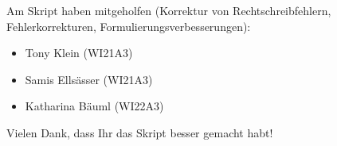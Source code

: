 Am Skript haben mitgeholfen
(Korrektur von Rechtschreibfehlern, Fehlerkorrekturen, Formulierungsverbesserungen):
\begin{itemize}
\item Tony Klein (WI21A3)
\item Samis Ellsässer (WI21A3)
\item Katharina Bäuml (WI22A3)
\end{itemize}
Vielen Dank, dass Ihr das Skript besser gemacht habt!
